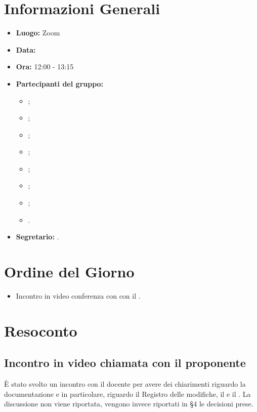 \section{Informazioni Generali}
\begin{itemize}
	\item \textbf{Luogo:} Zoom
	\item \textbf{Data:} \Data
	\item \textbf{Ora:} 12:00 - 13:15
	\item \textbf{Partecipanti del gruppo:}
	\begin{itemize}
		\item \AT{};
		\item \BR{};  
		\item \CE{}; 
		\item \DF{};
		\item \LD{};
		\item \MC{};
		\item \PF{};
		\item \SE{}.
	\end{itemize} 
	\item \textbf{Segretario:} \DF{}.
\end{itemize}

\section{Ordine del Giorno}
\begin{itemize}
	\item Incontro in video conferenza con con il \VT{}.
\end{itemize}

\section{Resoconto}

\subsection{Incontro in video chiamata con il proponente}
È stato svolto un incontro con il docente per avere dei chiarimenti riguardo la documentazione e in particolare, riguardo il Registro delle modifiche, il \MU e il \PdP.
La discussione non viene riportata, vengono invece riportati in §4 le decisioni prese.
\clearpage